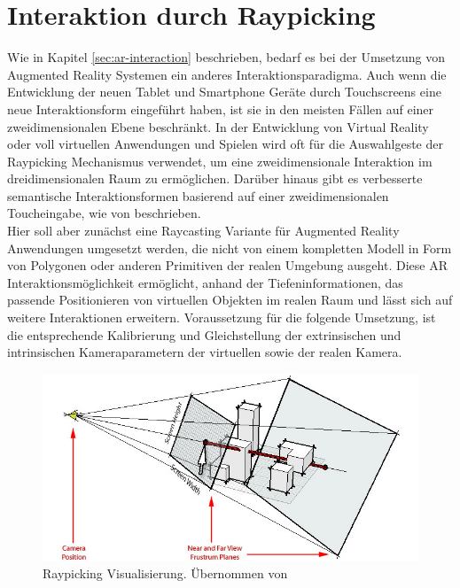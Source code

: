 \section{Interaktion durch Raypicking} \label{sec:ar-depth-interaction}

Wie in Kapitel \ref{sec:ar-interaction} beschrieben, bedarf es bei der Umsetzung von Augmented Reality Systemen ein anderes Interaktionsparadigma. Auch wenn die Entwicklung der neuen Tablet und Smartphone Geräte durch Touchscreens eine neue Interaktionsform eingeführt haben, ist sie in den meisten Fällen auf einer zweidimensionalen Ebene beschränkt. In der Entwicklung von Virtual Reality oder voll virtuellen Anwendungen und Spielen wird oft für die Auswahlgeste der Raypicking Mechanismus verwendet, um eine zweidimensionale Interaktion im dreidimensionalen Raum zu ermöglichen. Darüber hinaus gibt es verbesserte semantische Interaktionsformen basierend auf einer zweidimensionalen Toucheingabe, wie von \citet{elmqvist2008semantic} beschrieben.\\

Hier soll aber zunächst eine Raycasting Variante für Augmented Reality Anwendungen umgesetzt werden, die nicht von einem kompletten Modell in Form von Polygonen oder anderen Primitiven der realen Umgebung ausgeht. Diese AR Interaktionsmöglichkeit ermöglicht, anhand der Tiefeninformationen, das passende Positionieren von virtuellen Objekten im realen Raum und lässt sich auf weitere Interaktionen erweitern. Voraussetzung für die folgende Umsetzung, ist die entsprechende Kalibrierung und Gleichstellung der extrinsischen und intrinsischen Kameraparametern der virtuellen sowie der realen Kamera. \\

\begin{figure}[h]
  \centering
	\includegraphics[width=1.0\textwidth]{content/images/methods/interaction.jpg} 
  \caption{Raypicking Visualisierung. Übernommen von \citet{gluUn11:online}}
  \label{fig:interaction}
\end{figure}

